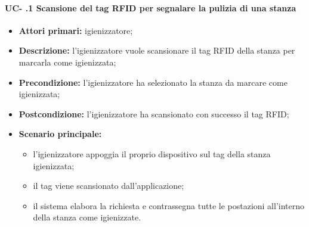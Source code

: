 \paragraph{UC- .1 Scansione del tag RFID per segnalare la pulizia di una stanza}

    \begin{itemize}
        \item \textbf{Attori primari:} igienizzatore;
        \item \textbf{Descrizione:} l’igienizzatore vuole scansionare il tag RFID della stanza per marcarla come igienizzata;
        \item \textbf{Precondizione:} l'igienizzatore ha selezionato la stanza da marcare come igienizzata; 
        \item \textbf{Postcondizione:} l'igienizzatore ha scansionato con successo il tag RFID;
        \item \textbf{Scenario principale:} 
            \begin{itemize}	
                \item l'igienizzatore appoggia il proprio dispositivo sul tag della stanza igienizzata;
                \item il tag viene scansionato dall'applicazione;
                \item il sistema elabora la richiesta e contrassegna tutte le postazioni all'interno della stanza come igienizzate.
            \end{itemize}
    \end{itemize}
